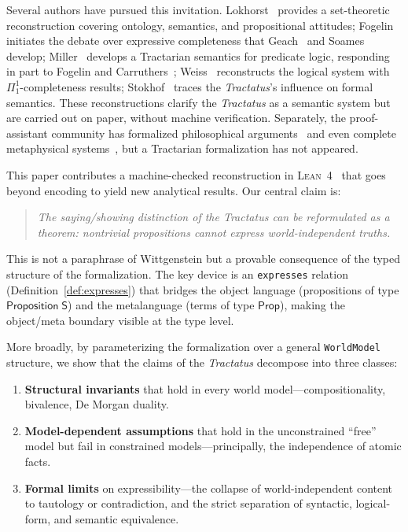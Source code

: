 \documentclass[jsl,bibother]{asl}
\theoremstyle{definition}
\theoremstyle{remark}
\newcommand{\Sach}{\mathsf{S}}
\newcommand{\Prop}{\mathsf{Prop}}
\newcommand{\Lean}{\textsc{Lean}}
\begin{document}
Several authors have pursued this invitation.
Lokhorst~\cite{lokhorst1988} provides a set-theoretic
reconstruction covering ontology, semantics, and propositional
attitudes;
Fogelin~\cite{fogelin1987} initiates the debate over expressive
completeness that Geach~\cite{geach1981} and
Soames~\cite{soames1983} develop;
Miller~\cite{miller1995} develops a Tractarian semantics for
predicate logic, responding in part to Fogelin and
Carruthers~\cite{carruthers1989};
Weiss~\cite{weiss2017} reconstructs the logical system with
$\Pi^1_1$-completeness results;
Stokhof~\cite{stokhof2008} traces the \emph{Tractatus}'s
influence on formal semantics.
These reconstructions clarify the \emph{Tractatus} as a semantic
system but are carried out on paper, without machine verification.
Separately, the proof-assistant community has formalized
philosophical arguments~\cite{benzmuller2017,fitelson2007} and
even complete metaphysical systems~\cite{scherf2025}, but a
Tractarian formalization has not appeared.

This paper contributes a machine-checked reconstruction in
\Lean~4~\cite{moura2021} that goes beyond encoding to yield new
analytical results.  Our central claim is:

\begin{quote}
\emph{The saying/showing distinction of the \emph{Tractatus} can
be reformulated as a theorem: nontrivial propositions cannot
express world-independent truths.}
\end{quote}

\noindent
This is not a paraphrase of Wittgenstein but a provable
consequence of the typed structure of the formalization.
The key device is an \texttt{expresses} relation (Definition~\ref{def:expresses})
that bridges the object language (propositions of type
$\mathsf{Proposition}\;\Sach$) and the metalanguage (terms of
type $\Prop$), making the object/meta boundary visible at the
type level.

More broadly, by parameterizing the formalization over a general
\texttt{WorldModel} structure, we show that the claims of the
\emph{Tractatus} decompose into three classes:
\begin{enumerate}[nosep]
  \item \textbf{Structural invariants} that hold in every world
    model---compositionality, bivalence, De Morgan duality.
  \item \textbf{Model-dependent assumptions} that hold in the
    unconstrained ``free'' model but fail in constrained
    models---principally, the independence of atomic facts.
  \item \textbf{Formal limits} on expressibility---the collapse
    of world-independent content to tautology or contradiction,
    and the strict separation of syntactic, logical-form, and
    semantic equivalence.
\end{enumerate}
\end{document}
